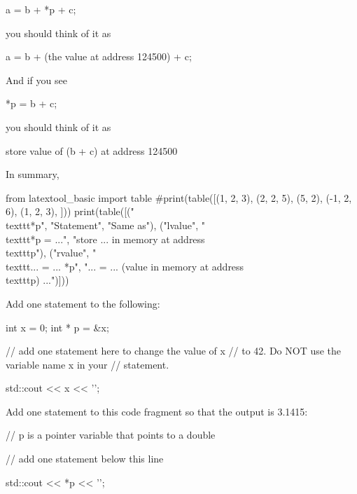 \begin{consolethree}[escapeinside=||]
a = b + *p + c;
\end{consolethree}

you should think of it as

\begin{consolethree}[escapeinside=||]
a = b + (the value at address 124500) + c;
\end{consolethree}

And if you see

\begin{consolethree}[escapeinside=||]
*p = b + c;
\end{consolethree}

you should think of it as

\begin{consolethree}[escapeinside=||]
store value of (b + c) at address 124500
\end{consolethree}

In summary,
\begin{python}
from latextool_basic import table
#print(table([(1, 2, 3), (2, 2, 5), (5, 2), (-1, 2, 6), (1, 2, 3), ]))
print(table([("\\texttt{*p}", "Statement", "Same as"), ("lvalue", "\\texttt{*p = ...}", "store ... in memory at address \\texttt{p}"), ("rvalue", "\\texttt{... = ... *p}", "... = ... (value in memory at address \\texttt{p}) ...")]))
\end{python}

\begin{ex}
Add one statement to the following:
\begin{consolethree}[escapeinside=||]
int x = 0;
int * p = &x;

// add one statement here to change the value of x
// to 42. Do NOT use the variable name x in your
// statement.

std::cout << x << '\n';
\end{consolethree}
\end{ex}

\begin{ex}
Add one statement to this code fragment so that the
output is 3.1415:
\begin{consolethree}[escapeinside=||]
// p is a pointer variable that points to a double

// add one statement below this line



std::cout << *p << '\n';
\end{consolethree}
\end{ex}

